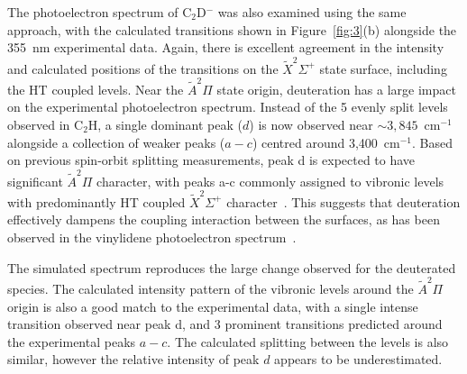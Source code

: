 \documentclass[journal=jpcafh,manuscript=article,layout=onecolumn, 12pt]{achemso}
\begin{document}
The photoelectron spectrum of C$_2$D$^-$ was also examined using the same approach, with the calculated transitions shown in Figure~\ref{fig:3}(b) alongside the 355~nm experimental data. Again, there is excellent agreement in the intensity and calculated positions of the transitions on the $\tilde{X} ^2\Sigma^+$ state surface, including the HT coupled levels. Near the $\tilde{A} ^2\Pi$ state origin, deuteration has a large impact on the experimental photoelectron spectrum. Instead of the 5 evenly split levels observed in C$_2$H, a single dominant peak ($d$) is now observed near $\sim3,845$~cm$^{-1}$ alongside a collection of weaker peaks ($a-c$) centred around 3,400~cm$^{-1}$. Based on previous spin-orbit splitting measurements, peak d is expected to have significant $\tilde{A} ^2\Pi$ character, with peaks a-c commonly assigned to vibronic levels with predominantly HT coupled $\tilde{X} ^2\Sigma^+$ character~\cite{yan87,hsu95,chi99,wil11}. This suggests that deuteration effectively dampens the coupling interaction between the surfaces, as has been observed in the vinylidene photoelectron spectrum~\cite{dev17}.

The simulated spectrum reproduces the large change observed for the deuterated species. The calculated intensity pattern of the vibronic levels around the $\tilde{A} ^2\Pi$ origin is also a good match to the experimental data, with a single intense transition observed near peak d, and 3 prominent transitions predicted around the experimental peaks $a-c$. The calculated splitting between the levels is also similar, however the relative intensity of peak $d$ appears to be underestimated. %
\end{document}
